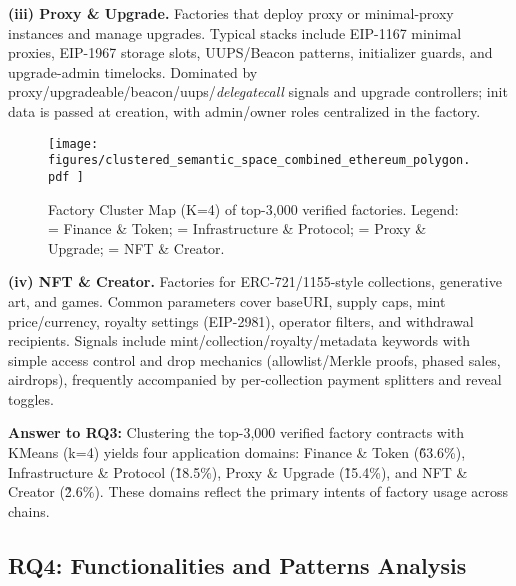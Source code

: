 \documentclass[acmsmall, screen]{acmart}
\begin{document}
	\textbf{(iii) Proxy \& Upgrade.} Factories that deploy proxy or minimal-proxy instances and manage
	upgrades. Typical stacks include EIP-1167 minimal proxies, EIP-1967 storage slots, UUPS/Beacon
	patterns, initializer guards, and upgrade-admin timelocks. Dominated by proxy/upgradeable/beacon/uups/\textit{delegatecall}
	signals and upgrade controllers; init data is passed at creation, with admin/owner roles
	centralized in the factory.

	\begin{figure}[t]
		\centering
		\texttt{[image: 
			figures/clustered\_semantic\_space\_combined\_ethereum\_polygon.pdf
		]}
		\caption{Factory Cluster Map (K=4) of top-3{,}000 verified factories. Legend: 
			= Finance \& Token;  = Infrastructure
			\& Protocol;  = Proxy \& Upgrade;
			 = NFT \& Creator.}
		\label{fig:rq3_cluster_map}
	\end{figure}

	\textbf{(iv) NFT \& Creator.} Factories for ERC-721/1155-style collections, generative art, and
	games. Common parameters cover baseURI, supply caps, mint price/currency, royalty settings (EIP-2981),
	operator filters, and withdrawal recipients. Signals include mint/collection/royalty/metadata keywords
	with simple access control and drop mechanics (allowlist/Merkle proofs, phased sales, airdrops),
	frequently accompanied by per-collection payment splitters and reveal toggles.

	\begin{answerbox}
		\textbf{Answer to RQ3:} Clustering the top-3,000 verified factory contracts with KMeans (k=4)
		yields four application domains: Finance \& Token (\~63.6\%), Infrastructure \& Protocol (\~18.5\%),
		Proxy \& Upgrade (\~15.4\%), and NFT \& Creator (\~2.6\%). These domains reflect the primary
		intents of factory usage across chains.
	\end{answerbox}
	\subsection{RQ4: Functionalities and Patterns Analysis}
\end{document}
